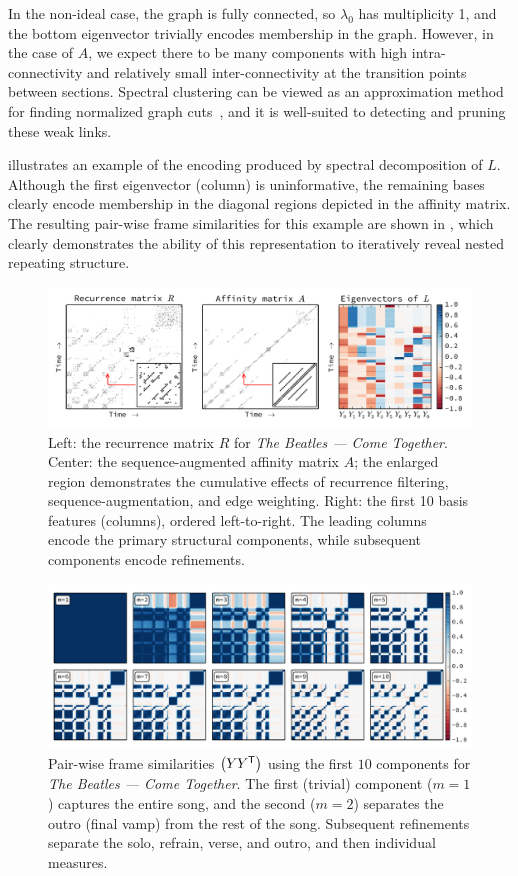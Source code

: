 \documentclass{article}
\begin{document}
In the non-ideal case, the graph is fully connected, so $\lambda_0$ has multiplicity 1, 
and the bottom eigenvector trivially encodes membership in the graph. 
However, in the case of $A$, we expect there to be many components
with high intra-connectivity and relatively small inter-connectivity at the
transition points between sections.  Spectral clustering can be viewed as an approximation 
method for finding normalized graph cuts~\cite{von2007tutorial}, and it is well-suited to detecting and pruning these weak links.

 illustrates an example of the encoding produced by spectral
decomposition of $L$.  Although the first eigenvector (column) is uninformative, 
the remaining bases clearly encode membership in the diagonal regions depicted in the 
affinity matrix.  
The resulting pair-wise frame similarities for this example are shown in , 
which clearly demonstrates the ability of this representation to iteratively reveal 
nested repeating structure.

\begin{figure}[t]
\centering
\includegraphics[width=\textwidth]{figs/recurrence}
\caption{Left: the recurrence matrix $R$ for \emph{The Beatles --- Come
Together}. Center: the sequence-augmented affinity matrix $A$; the enlarged region
demonstrates the cumulative effects of recurrence filtering, sequence-augmentation, and
edge weighting.
Right: the first 10 basis features (columns), ordered left-to-right.  
The leading columns encode the primary structural components, while subsequent
components encode refinements.\label{recurrence}}
\end{figure}

 
\begin{figure}[t]
\centering
\includegraphics[width=\textwidth]{figs/lowrank}
\caption{Pair-wise frame similarities $\left(YY^\mathsf{T}\right)$ using the first $10$ components for \emph{The Beatles --- Come Together}.  The first
(trivial) component ($m=1$) captures the entire song, and the second ($m=2$) separates
the outro (final vamp) from the rest of the song.  
Subsequent refinements separate the solo, refrain, verse, and outro, and then individual measures.\label{lowrank}}
\end{figure}
\end{document}
